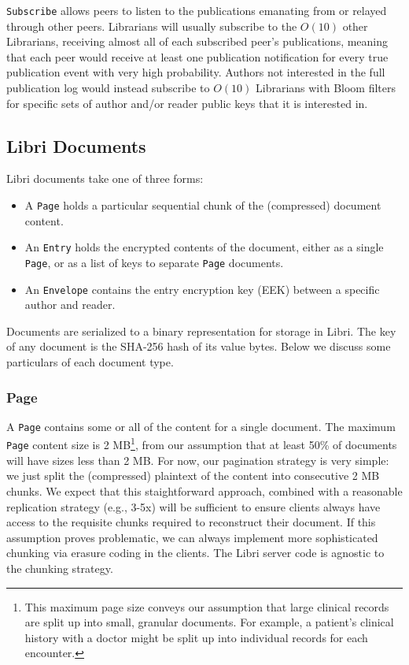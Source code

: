 \documentclass[10pt]{article}
\newcommand{\ttt}[1]{\texttt{#1}}
\def\Entry{\ttt{Entry}}
\def\Page{\ttt{Page}}
\def\Envelope{\ttt{Envelope}}
\begin{document}
\ttt{Subscribe} allows peers to listen to the publications emanating from or relayed through other peers. Librarians will usually subscribe to the $O(10)$ other Librarians, receiving almost all of each subscribed peer's publications, meaning that each peer would receive at least one publication notification for every true publication event with very high probability. Authors not interested in the full publication log would instead subscribe to $O(10)$ Librarians with Bloom filters for specific sets of author and/or reader public keys that it is interested in.

\subsection{Libri Documents}
\label{sec:Docs}
Libri documents take one of three forms:
\begin{itemize}
	\item A \Page{} holds a particular sequential chunk of the (compressed) document content. 
	\item An \Entry{} holds the encrypted contents of the document, either as a single \Page{}, or as a list of keys to separate \Page{} documents.
	\item An \Envelope{} contains the entry encryption key (EEK) between a specific author and reader.
\end{itemize}
Documents are serialized to a binary representation for storage in Libri. The key of any document is the SHA-256 hash of its value bytes. Below we discuss some particulars of each document type.

\subsubsection{Page}
A \Page{} contains some or all of the content for a single document. The maximum \Page {} content size is 2 MB\footnote{This maximum page size conveys our assumption that large clinical records are split up into small, granular documents. For example, a patient's clinical history with a doctor might be split up into individual records for each encounter.}, from our assumption that at least 50\% of documents will have sizes less than 2 MB. For now, our pagination strategy is very simple: we just split the (compressed) plaintext of the content into consecutive 2 MB chunks. We expect that this staightforward approach, combined with a reasonable replication strategy (e.g., 3-5x) will be sufficient to ensure clients always have access to the requisite chunks required to reconstruct their document. If this assumption proves problematic, we can always implement more sophisticated chunking via erasure coding in the clients. The Libri server code is agnostic to the chunking strategy.
\end{document}
